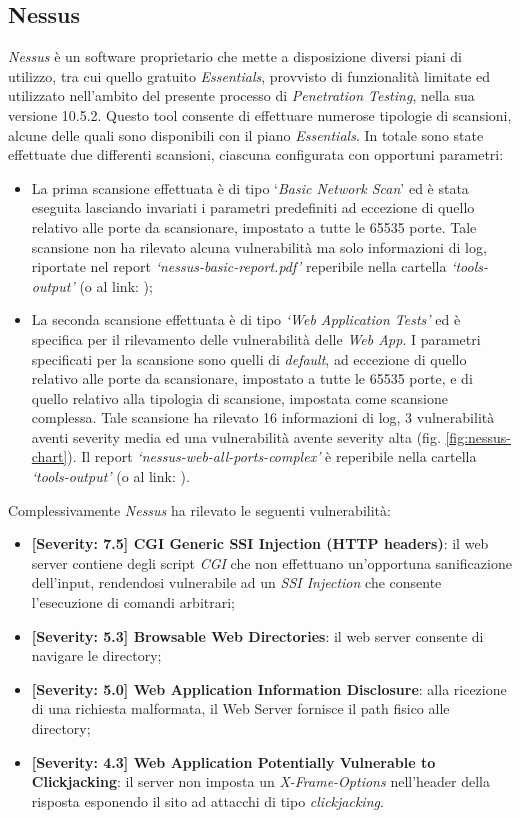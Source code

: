 \subsection{Nessus}
\emph{Nessus} è un software proprietario che mette a disposizione diversi piani di utilizzo, tra cui quello gratuito \emph{Essentials}, provvisto di funzionalità limitate ed utilizzato nell'ambito del presente processo di \emph{Penetration Testing}, nella sua versione 10.5.2. Questo tool consente di effettuare numerose tipologie di scansioni, alcune delle quali sono disponibili con il piano \emph{Essentials}. In totale sono state effettuate due differenti scansioni, ciascuna configurata con opportuni parametri:
\begin{itemize}
    \item La prima scansione effettuata è di tipo `\emph{Basic Network Scan}' ed è stata eseguita lasciando invariati i parametri predefiniti ad eccezione di quello relativo alle porte da scansionare, impostato a tutte le 65535 porte. Tale scansione non ha rilevato alcuna vulnerabilità ma solo informazioni di log, riportate nel report \emph{`nessus-basic-report.pdf'} reperibile nella cartella \emph{`tools-output'} (o al link: );
    \item La seconda scansione effettuata è di tipo \emph{`Web Application Tests'} ed è specifica per il rilevamento delle vulnerabilità delle \emph{Web App}. I parametri specificati per la scansione sono quelli di \emph{default}, ad eccezione di quello relativo alle porte da scansionare, impostato a tutte le 65535 porte, e di quello relativo alla tipologia di scansione, impostata come scansione complessa. Tale scansione ha rilevato 16 informazioni di log, 3 vulnerabilità aventi severity media ed una vulnerabilità avente severity alta (fig. \ref{fig:nessus-chart}). Il report \emph{`nessus-web-all-ports-complex'} è reperibile nella cartella \emph{`tools-output'} (o al link: ).
\end{itemize}
Complessivamente \emph{Nessus} ha rilevato le seguenti vulnerabilità:
\begin{itemize}
    \item \textbf{[Severity: 7.5] CGI Generic SSI Injection (HTTP headers)}: il web server contiene degli script \emph{CGI} che non effettuano un'opportuna sanificazione dell'input, rendendosi vulnerabile ad un \emph{SSI Injection} che consente l'esecuzione di comandi arbitrari;
    \item \textbf{[Severity: 5.3] Browsable Web Directories}: il web server consente di navigare le directory;
    \item \textbf{[Severity: 5.0] Web Application Information Disclosure}: alla ricezione di una richiesta malformata, il Web Server fornisce il path fisico alle directory;
    \item \textbf{[Severity: 4.3] Web Application Potentially Vulnerable to Clickjacking}: il server non imposta un \emph{X-Frame-Options} nell'header della risposta esponendo il sito ad attacchi di tipo \emph{clickjacking}.
\end{itemize}
